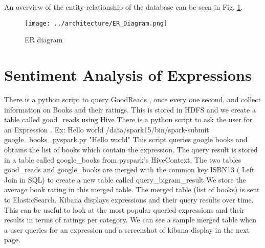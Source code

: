\documentclass[12pt,letterpaper]{article}
\begin{document}
An overview of the entity-relationship of the database can be seen in Fig. \ref{ER}.


\begin{figure}[!ht]
\texttt{[image: ../architecture/ER\_Diagram.png]}
\caption{ER diagram \label{ER}}
\end{figure}


\section{Sentiment Analysis of Expressions}

There is a python script to query GoodReads , once every one second, and collect information on Books and their ratings. This is stored in HDFS and we create a table called good_reads using Hive
There is a python script to ask the user for an Expression . Ex: Hello world
/data/spark15/bin/spark-submit google_books_pyspark.py "Hello world"
This script queries google books and obtains the list of books which contain the expression.
The query result is stored in a table called google_books from pyspark’s HiveContext.
The two tables good_reads and google_books are merged with the common key ISBN13 ( Left Join in SQL)  to create a new  table called query_bigram_result
We store the average book rating in this merged table.
The merged table (list of books) is sent to ElasticSearch. 
Kibana displays expressions and  their query results over time. This can be useful to look at the most popular queried expressions and their results in terms of ratings per category.
We can see a sample merged table when a user queries for an expression and a screenshot of kibana display in the next page.
\end{document}

